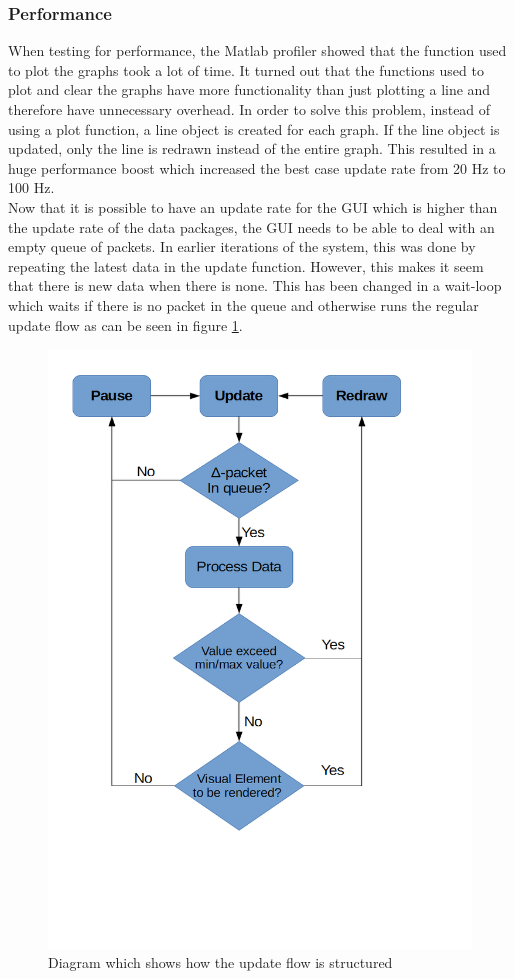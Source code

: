 \subsubsection{Performance}
\label{sec:PerfS4}
When testing for performance, the Matlab profiler showed that the function used to plot the graphs took a lot of time. It turned out that the functions used to plot and clear the graphs have more functionality than just plotting a line and therefore have 	unnecessary overhead. In order to solve this problem, instead of using a plot function, a line object is created for each graph. If the line object is updated, only the line is redrawn instead of the entire graph. This resulted in a huge performance boost which increased the best case update rate from 20 Hz to 100 Hz.\\

Now that it is possible to have an update rate for the GUI which is higher than the update rate of the data packages, the GUI needs to be able to deal with an empty queue of packets. In earlier iterations of the system, this was done by repeating the latest data in the update function. However, this makes it seem that there is new data when there is none. This has been changed in a wait-loop which waits if there is no packet in the queue and otherwise runs the regular update flow as can be seen in figure \ref{fig:UpdateFlow}. 
\begin{figure}[H]
	\centering
	\includegraphics[width=.75\textwidth]{images/UpdateFlow}
	\caption{Diagram which shows how the update flow is structured} 
	\label{fig:UpdateFlow}
\end{figure} 
